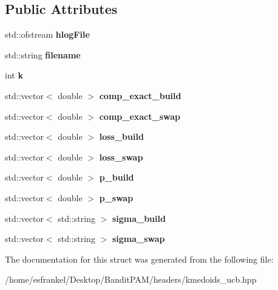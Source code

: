 \subsection*{Public Attributes}
\begin{DoxyCompactItemize}
\item 
\mbox{\label{structLogHelper_a084e11845451a653f46a48ab92c97ee8}} 
std\+::ofstream {\bfseries hlog\+File}
\item 
\mbox{\label{structLogHelper_a2bb0e407e73b941f36bb6b862e608e79}} 
std\+::string {\bfseries filename}
\item 
\mbox{\label{structLogHelper_ac606e3c78f973cb42f55ea6f8a11e509}} 
int {\bfseries k}
\item 
\mbox{\label{structLogHelper_a7f9490e07d6bfc71b0d0fd555ca4f530}} 
std\+::vector$<$ double $>$ {\bfseries comp\+\_\+exact\+\_\+build}
\item 
\mbox{\label{structLogHelper_aaee1d830760c6b497f2fad31a0e368f8}} 
std\+::vector$<$ double $>$ {\bfseries comp\+\_\+exact\+\_\+swap}
\item 
\mbox{\label{structLogHelper_a8da7e85d166977478fcfe848bb739dfa}} 
std\+::vector$<$ double $>$ {\bfseries loss\+\_\+build}
\item 
\mbox{\label{structLogHelper_a3361ae9284a7fca5b867165e0380af4b}} 
std\+::vector$<$ double $>$ {\bfseries loss\+\_\+swap}
\item 
\mbox{\label{structLogHelper_aed75dac28380b3f67b777d6b36719aa9}} 
std\+::vector$<$ double $>$ {\bfseries p\+\_\+build}
\item 
\mbox{\label{structLogHelper_a87a35e651ad2a32092777e1d9bd4acfa}} 
std\+::vector$<$ double $>$ {\bfseries p\+\_\+swap}
\item 
\mbox{\label{structLogHelper_a835a54928567970dd564d9eaed87597c}} 
std\+::vector$<$ std\+::string $>$ {\bfseries sigma\+\_\+build}
\item 
\mbox{\label{structLogHelper_afee211952d9a61c217622557e91c1275}} 
std\+::vector$<$ std\+::string $>$ {\bfseries sigma\+\_\+swap}
\end{DoxyCompactItemize}


The documentation for this struct was generated from the following file\+:\begin{DoxyCompactItemize}
\item 
/home/esfrankel/\+Desktop/\+Bandit\+P\+A\+M/headers/kmedoids\+\_\+ucb.\+hpp\end{DoxyCompactItemize}
